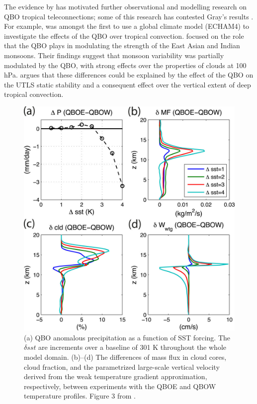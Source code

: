 The evidence by \cite{gray1992} has motivated further observational and modelling research on QBO tropical teleconnections; some of this research has contested Gray's results \citep[e.g.][]{chan1995,camargo2010,hansen2016tropospheric}. 
For example, \cite{giorgetta1999} was amongst the first to use a global climate model (ECHAM4) to investigate the effects of the QBO over tropical convection. \cite{giorgetta1999} focused on the role that the QBO plays in modulating the strength of the East Asian and Indian monsoons. Their findings suggest that monsoon variability was partially modulated by the QBO, with strong effects over the properties of clouds at 100 hPa. \cite{giorgetta1999} argues that these differences could be explained by the effect of the QBO on the UTLS static stability and a consequent effect over the vertical extent of deep tropical convection. 

\begin{figure}[t!]
\centering
\includegraphics[width=0.85\linewidth]{figures/nie_sobel}
\caption[The non-linear relationship of the QBO with SST forcings]{(a) QBO anomalous precipitation as a function of SST forcing. The $\delta sst$ are increments over a baseline of 301 K throughout the whole model domain. (b)–(d) The differences of mass flux in cloud cores, cloud fraction, and the parametrized large-scale vertical velocity derived from the weak temperature gradient approximation, respectively, between experiments with the QBOE and QBOW temperature profiles. Figure 3 from \cite{nie2015}. }
\label{fig:nie}
\end{figure}  

